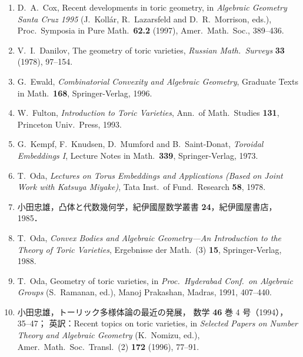 \documentclass[uplatex,dvipdfmx]{jlreq}
\begin{document}
\bigskip


\renewcommand{\labelenumi}{[\arabic{enumi}]}

\begin{enumerate}
  \setlength{\itemsep}{3pt}

  \item D.~A.~Cox,
        Recent developments in toric geometry,
        in \textit{Algebraic Geometry Santa Cruz 1995}
        (J.~Koll\'ar, R.~Lazarsfeld and D.~R.~Morrison, eds.),
        Proc.\ Symposia in Pure Math.\ \textbf{62.2} (1997),
        Amer.\ Math.\ Soc., 389--436.

  \item V.~I.~Danilov,
        The geometry of toric varieties,
        \textit{Russian Math.\ Surveys} \textbf{33} (1978), 97--154.

  \item G.~Ewald,
        \textit{Combinatorial Convexity and Algebraic Geometry},
        Graduate Texts in Math.\ \textbf{168}, Springer-Verlag, 1996.

  \item W.~Fulton,
        \textit{Introduction to Toric Varieties},
        Ann.\ of Math.\ Studies \textbf{131}, Princeton Univ.\ Press, 1993.

  \item G.~Kempf, F.~Knudsen, D.~Mumford and B.~Saint-Donat,
        \textit{Toroidal Embeddings I},
        Lecture Notes in Math.\ \textbf{339}, Springer-Verlag, 1973.

  \item T.~Oda,
        \textit{Lectures on Torus Embeddings and Applications
        (Based on Joint Work with Katsuya Miyake)},
        Tata Inst.\ of Fund.\ Research \textbf{58}, 1978.

  \item 小田忠雄，凸体と代数幾何学，紀伊國屋数学叢書 \textbf{24}，紀伊國屋書店，1985．

  \item T.~Oda,
        \textit{Convex Bodies and Algebraic Geometry---An Introduction
        to the Theory of Toric Varieties},
        Ergebnisse der Math.\ (3) \textbf{15}, Springer-Verlag, 1988.

  \item T.~Oda,
        Geometry of toric varieties,
        in \textit{Proc.\ Hyderabad Conf.\ on Algebraic Groups}
        (S.~Ramanan, ed.), Manoj Prakashan, Madras, 1991, 407--440.

  \item 小田忠雄，トーリック多様体論の最近の発展，
        数学 \textbf{46} 巻 4 号（1994），35--47；
        英訳：Recent topics on toric varieties,
        in \textit{Selected Papers on Number Theory and Algebraic Geometry}
        (K.~Nomizu, ed.),
        Amer.\ Math.\ Soc.\ Transl.\ (2) \textbf{172} (1996), 77--91.

\end{enumerate}
\end{document}
